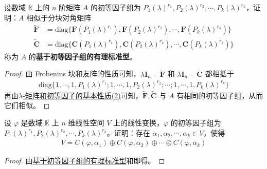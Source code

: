 \documentclass[../../main.tex]{subfiles}%
\begin{document}
\begin{theorem}[基于初等因子组的有理标准型]\label{theorem:基于初等因子组的有理标准型}
设数域 $\mathbb{K}$ 上的 $n$ 阶矩阵 $A$ 的初等因子组为 $P_1(\lambda)^{r_1},P_2(\lambda)^{r_2},\cdots,P_k(\lambda)^{r_k}$，证明：$A$ 相似于分块对角矩阵
\begin{align*}
\widetilde{\boldsymbol{F}}&=\mathrm{diag}\{\boldsymbol{F}(P_1(\lambda)^{r_1}),\boldsymbol{F}(P_2(\lambda)^{r_2}),\cdots,\boldsymbol{F}(P_k(\lambda)^{r_k})\}\\
\widetilde{\boldsymbol{C}}&=\mathrm{diag}\{\boldsymbol{C}(P_1(\lambda)^{r_1}),\boldsymbol{C}(P_2(\lambda)^{r_2}),\cdots,\boldsymbol{C}(P_k(\lambda)^{r_k})\}
\end{align*}
称为 $A$ 的\textbf{基于初等因子组的有理标准型}。
\end{theorem}
\begin{proof}

由 Frobenius 块和友阵的性质可知，$\lambda\boldsymbol{I}_n - \widetilde{\boldsymbol{F}}$ 和 $\lambda\boldsymbol{I}_n - \widetilde{\boldsymbol{C}}$ 都相抵于
\begin{align*}
\mathrm{diag}\{1,\cdots,1,P_1(\lambda)^{r_1};1,\cdots,1,P_2(\lambda)^{r_2};\cdots;1,\cdots,1,P_k(\lambda)^{r_k}\}
\end{align*}
再由\hyperref[theorem:lambda-矩阵和初等因子的基本性质]{$\lambda$-矩阵和初等因子的基本性质(2)}可知，$\widetilde{\boldsymbol{F}},\widetilde{\boldsymbol{C}}$ 与 $A$ 有相同的初等因子组，从而它们相似。

\end{proof}

\begin{theorem}\label{theorem:基于初等因子组的循环子空间之和分解}
设 $\varphi$ 是数域 $\mathbb{K}$ 上 $n$ 维线性空间 $V$ 上的线性变换，$\varphi$ 的初等因子组为 $P_1(\lambda)^{r_1},P_2(\lambda)^{r_2},\cdots,P_k(\lambda)^{r_k}$。证明：存在 $\alpha_1,\alpha_2,\cdots,\alpha_k\in V$，使得
\begin{align*}
V = C(\varphi,\alpha_1)\oplus C(\varphi,\alpha_2)\oplus\cdots\oplus C(\varphi,\alpha_k)
\end{align*}
\end{theorem}
\begin{proof}

由\hyperref[theorem:基于初等因子组的有理标准型]{基于初等因子组的有理标准型}和即得。

\end{proof}
\end{document}
